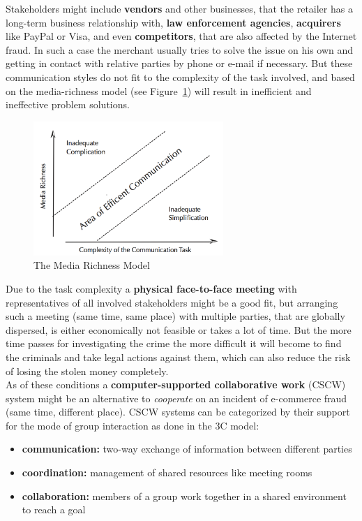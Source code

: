 Stakeholders might include \textbf{vendors} and other businesses, that the retailer has a long-term business relationship with, \textbf{law enforcement agencies}, \textbf{acquirers} like PayPal or Visa,
and even \textbf{competitors}, that are also affected by the Internet fraud. In such a case the merchant usually tries to solve the issue on his own and getting in contact with relative parties by phone or e-mail
if necessary. But these communication styles do not fit to the complexity of the task involved, and based on the media-richness model (see Figure~\ref{fig:images_media_richness_model}) will result in inefficient and ineffective problem solutions. \\

\begin{figure}[!ht]
	\centering
		\includegraphics[height=2in]{images/media-richness-model.png}
	\caption{The Media Richness Model \citep{Rice1992}}
\label{fig:images_media_richness_model}
\end{figure}

Due to the task complexity a \textbf{physical face-to-face meeting} with representatives of all involved stakeholders might be a good fit, but arranging such a meeting (same time, same place) with multiple parties,
that are globally dispersed, is either economically not feasible or takes a lot of time. But the more time passes for investigating the crime the more difficult it will become to find the criminals and take legal actions against them,
which can also reduce the risk of losing the stolen money completely. \\

As of these conditions a \textbf{computer-supported collaborative work} (CSCW) system might be an alternative to \textit{cooperate} on an incident of e-commerce fraud (same time, different place).
CSCW systems can be categorized by their support for the mode of group interaction as done in the 3C model:

\begin{itemize}
    \item\textbf{communication:} two-way exchange of information between different parties
    \item\textbf{coordination:} management of shared resources like meeting rooms
    \item\textbf{collaboration:} members of a group work together in a shared environment to reach a goal
\end{itemize}

